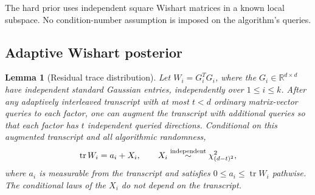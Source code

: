 \documentclass[11pt]{article}
\newtheorem{lemma}[theorem]{Lemma}
\theoremstyle{definition}\newtheorem{definition}[theorem]{Definition}
\theoremstyle{remark}\newtheorem{remark}[theorem]{Remark}
\newcommand{\R}{\mathbb R}\newcommand{\C}{\mathbb C}
\newcommand{\tr}{\operatorname{tr}}\newcommand{\rank}{\operatorname{rank}}
\begin{document}
The hard prior uses independent square Wishart matrices in a known local
subspace. No condition-number assumption is imposed on the algorithm's queries.

\subsection{Adaptive Wishart posterior}

\begin{lemma}[Residual trace distribution]\label{lem:posterior}
Let $W_i=G_i^TG_i$, where the $G_i\in\R^{d\times d}$ have independent standard
Gaussian entries, independently over $1\le i\le k$.
After any adaptively interleaved transcript with at most $t<d$ ordinary
matrix-vector queries to each factor, one can augment the transcript with
additional queries so that each factor has $t$ independent queried directions.
Conditional on this augmented transcript and all algorithmic randomness,
\begin{equation}\label{eq:posterior}
 \tr W_i=a_i+X_i,\qquad X_i\stackrel{\rm independent}{\sim}\chi^2_{(d-t)^2},
\end{equation}
where $a_i$ is measurable from the transcript and satisfies
$0\le a_i\le\tr W_i$ pathwise. The conditional laws of the $X_i$ do not depend
on the transcript.
\end{lemma}
\end{document}
